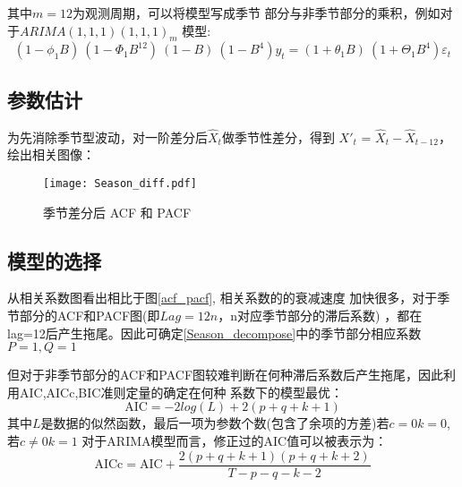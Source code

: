 \documentclass[12pt,a4paper]{nmmcm}
\begin{document}
其中\(m=12\)为观测周期，可以将模型写成季节
部分与非季节部分的乘积，例如对于\(ARIMA(1,1,1)(1,1,1)_m\)
模型:
\begin{equation}
  (1 - \phi_{1}B)~(1 - \Phi_{1}B^{12})~(1 - B)~(1 - B^{4})y_{t} = (1 + \theta_{1}B)~ (1 + \Theta_{1}B^{4})\varepsilon_{t}
\end{equation}

 \subsection{参数估计}
 为先消除季节型波动，对一阶差分后\(\hat{X}_t\)做季节性差分，得到
 \(X'_{t}\) = \(\hat{X}_t-\hat{X}_{t-12}\)，绘出相关图像：
 \begin{figure}[H] %
  \centering %
  \texttt{[image: Season\_diff.pdf]} %
  \caption{季节差分后 ACF 和 PACF} %
  \label{season_diff} %
  \end{figure}
  \subsection{模型的选择}
  从相关系数图看出相比于图\ref{acf_pacf}, 相关系数的的衰减速度
  加快很多，对于季节部分的ACF和PACF图(即\(Lag=12n\)，n对应季节部分的滞后系数)
  ，都在lag=12后产生拖尾。因此可确定\ref{Season_decompose}中的季节部分相应系数\(P=1 , Q=1\)

  但对于非季节部分的ACF和PACF图较难判断在何种滞后系数后产生拖尾，因此利用AIC,AICc,BIC准则定量的确定在何种
  系数下的模型最优：
  \begin{equation*}
    \text{AIC} = -2log(L) + 2(p+q+k+1)
  \end{equation*}
  其中\(L\)是数据的似然函数，最后一项为参数个数(包含了余项的方差)若\(c=0\)\(k=0\),若\(c\neq0\)\(k=1\)
  对于ARIMA模型而言，修正过的AIC值可以被表示为\cite{Rob}：
  \begin{equation*}
    \text{AICc} = \text{AIC} + \frac{2(p+q+k+1)(p+q+k+2)}{T-p-q-k-2}
  \end{equation*}
\end{document}
